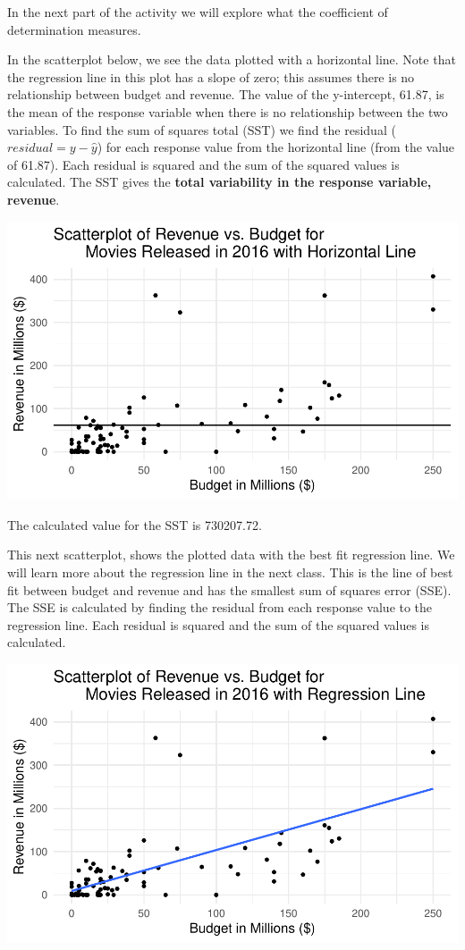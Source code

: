 \documentclass[
]{report}
\begin{document}
In the next part of the activity we will explore what the coefficient of determination measures.

In the scatterplot below, we see the data plotted with a horizontal line. Note that the regression line in this plot has a slope of zero; this assumes there is no relationship between budget and revenue. The value of the y-intercept, 61.87, is the mean of the response variable when there is no relationship between the two variables. To find the sum of squares total (SST) we find the residual (\(residual = y - \hat{y}\)) for each response value from the horizontal line (from the value of 61.87). Each residual is squared and the sum of the squared values is calculated. The SST gives the \textbf{total variability in the response variable, revenue}.

\begin{center}\includegraphics[width=0.7\linewidth]{04-OCA03-EDA-two-quantitative-corr_files/figure-latex/unnamed-chunk-2-1} \end{center}

The calculated value for the SST is 730207.72.

This next scatterplot, shows the plotted data with the best fit regression line. We will learn more about the regression line in the next class. This is the line of best fit between budget and revenue and has the smallest sum of squares error (SSE). The SSE is calculated by finding the residual from each response value to the regression line. Each residual is squared and the sum of the squared values is calculated.

\begin{center}\includegraphics[width=0.7\linewidth]{04-OCA03-EDA-two-quantitative-corr_files/figure-latex/unnamed-chunk-3-1} \end{center}
\end{document}
